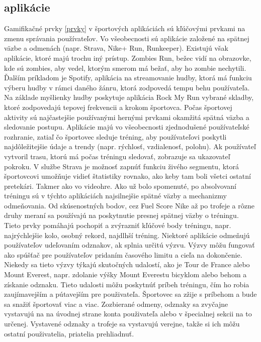 \documentclass[10pt,twoside,slovak,a4paper]{article}
\begin{document}
\subsection{aplikácie} \label{aplikácie}

Gamifikačné prvky \ref{prvky} v športových aplikáciách sú kľúčovými prvkami na zmenu správania používateľov. Vo všeobecnosti sú aplikácie založené na spätnej väzbe a odmenách (napr. Strava, Nike+ Run, Runkeeper). Existujú však aplikácie, ktoré majú trochu iný prístup. Zombies Run, bežec vidí na obrazovke, kde sú zombies, aby vedel, ktorým smerom má bežať, aby ho zombie nechytili. Ďalším príkladom je Spotify, aplikácia na streamovanie hudby, ktorá má funkciu výberu hudby v rámci daného žánru, ktorá zodpovedá tempu behu používateľa. Na základe myšlienky hudby poskytuje aplikácia Rock My Run vybrané skladby, ktoré zodpovedajú tepovej frekvencii a krokom športovca. Počas športovej aktivity sú najčastejšie používanými hernými prvkami okamžitá spätná väzba a sledovanie postupu. Aplikácie majú vo všeobecnosti zjednodušené používateľské rozhranie, zatiaľ čo športovec sleduje tréning, aby používateľovi poskytli najdôležitejšie údaje a trendy (napr. rýchlosť, vzdialenosť, polohu). Ak používateľ vytvoril trasu, ktorú má počas tréningu sledovať, zobrazuje sa ukazovateľ pokroku. V službe Strava je možnosť zapnúť funkciu živého segmentu, ktorá športovcovi umožňuje vidieť štatistiky rovnako, ako keby tam boli všetci ostatní pretekári. Takmer ako vo videohre.\cite{Gamification_in_sport_apps-Framework}
Ako už bolo spomenuté, po absolvovaní tréningu sú v týchto aplikáciách najsilnejšie spätné väzby a mechanizmy odmeňovania. Od skúsenostných bodov, cez Fuel Score Nike až po trofeje a rôzne druhy meraní sa používajú na poskytnutie presnej spätnej väzby o tréningu. Tieto prvky pomáhajú pochopiť a zvýrazniť kľúčové body tréningu, napr. najrýchlejšie kolo, osobný rekord, najdlhší tréning.
Niektoré aplikácie odmeňujú používateľov udeľovaním odznakov, ak splnia určitú výzvu. Výzvy môžu fungovať ako spúšťač pre používateľov pridaním časového limitu a cieľa na dokončenie. Niekedy sa tieto výzvy týkajú skutočných udalostí, ako je Tour de France alebo Mount Everest, napr. zdolanie výšky Mount Everestu bicyklom alebo behom a získanie odznaku. Tieto udalosti môžu poskytnúť príbeh tréningu, čím ho robia zaujímavejším a pútavejším pre použivateľa. Športovec sa zžije s príbehom a bude sa snažiť športovať viac a viac. Zozbierané odmeny, odznaky sa zvyčajne vystavujú na na úvodnej strane konta použivateľa alebo v špecialnej sekcii na to určenej. Vystavené odznaky a trofeje sa vystavujú verejne, takže si ich môžu ostatní použivatelia, priatelia prehliadnuť.\cite{Effect_of_gamification-Framework}
\end{document}
